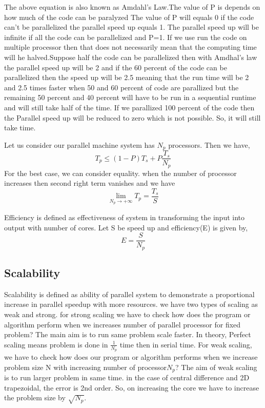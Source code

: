 \documentclass{article}
\begin{document}
  The above equation is also known as Amdahl's  Law.The value of P is depends on how much of the code can be paralyzed The value of P will equals 0 if the code can't be parallelized the parallel speed up equals 1. The parallel speed up will be infinite if all the code can be parallelized and P=1.
   If we use run the code on multiple processor then that does not necessarily mean that the computing time will he halved.Suppose half the code can be parallelized  then with Amdhal's law the parallel speed up will be 2 and if the 60 percent of the code can be parallelized then the speed up will be 2.5 meaning that the run time will be 2 and 2.5 times faster when 50 and 60 percent of code are parallized  but the remaining 50 percent and 40 percent will have to be run in a sequential runtime  and will still take half of the time. If we parallized 100 percent of the code then the Parallel speed up will be reduced to zero which is not possible. So, it will still take time.
  
  Let us consider our parallel machine system has $N_p$ processors. Then we have,
  \begin{equation}
      T_p \leq (1-P) T_s + P \frac{T_s}{N_p}
  \end{equation}
  For the best case, we can consider equality. when the number of processor increases then second right term vanishes and we have 
  \begin{equation}
        \lim_{N_p \to +\infty} T_p =  \frac{T_s}{S}
  \end{equation}

Efficiency is defined as effectiveness of system in transforming the input into output with number of cores. Let S be speed up and efficiency(E) is given by,
\begin{equation}
    E = \frac{S}{N_p}
\end{equation}

\subsection{Scalability}
Scalability is defined as ability of parallel system to  demonstrate a proportional increase in parallel speedup with more resources. we have two types of scaling as weak and strong. for strong scaling we have to check how does the program or algorithm perform when we increases number of parallel processor for fixed problem? The main aim is to run same problem scale faster. In theory, Perfect scaling means problem is done in $\frac{1}{N_p}$ time then in serial time. For weak scaling, we have to check how does our program or algorithm performs when we increase problem size N with increasing number of processor$N_p$? The aim of weak scaling is to run larger problem in same time. in the case of central difference and 2D trapezoidal, the error is 2nd order. So, on increasing the core we have to increase the problem size by $\sqrt{N_p}$. 
\end{document}

